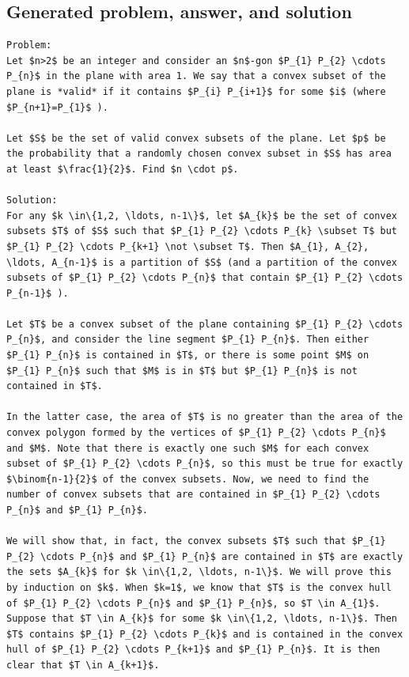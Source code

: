 \documentclass[11pt]{article}
\begin{document}
\subsection*{Generated problem, answer, and solution}
\begin{lstlisting}[style=modeloutput]
Problem:
Let $n>2$ be an integer and consider an $n$-gon $P_{1} P_{2} \cdots P_{n}$ in the plane with area 1. We say that a convex subset of the plane is *valid* if it contains $P_{i} P_{i+1}$ for some $i$ (where $P_{n+1}=P_{1}$ ).

Let $S$ be the set of valid convex subsets of the plane. Let $p$ be the probability that a randomly chosen convex subset in $S$ has area at least $\frac{1}{2}$. Find $n \cdot p$.

Solution:
For any $k \in\{1,2, \ldots, n-1\}$, let $A_{k}$ be the set of convex subsets $T$ of $S$ such that $P_{1} P_{2} \cdots P_{k} \subset T$ but $P_{1} P_{2} \cdots P_{k+1} \not \subset T$. Then $A_{1}, A_{2}, \ldots, A_{n-1}$ is a partition of $S$ (and a partition of the convex subsets of $P_{1} P_{2} \cdots P_{n}$ that contain $P_{1} P_{2} \cdots P_{n-1}$ ).

Let $T$ be a convex subset of the plane containing $P_{1} P_{2} \cdots P_{n}$, and consider the line segment $P_{1} P_{n}$. Then either $P_{1} P_{n}$ is contained in $T$, or there is some point $M$ on $P_{1} P_{n}$ such that $M$ is in $T$ but $P_{1} P_{n}$ is not contained in $T$.

In the latter case, the area of $T$ is no greater than the area of the convex polygon formed by the vertices of $P_{1} P_{2} \cdots P_{n}$ and $M$. Note that there is exactly one such $M$ for each convex subset of $P_{1} P_{2} \cdots P_{n}$, so this must be true for exactly $\binom{n-1}{2}$ of the convex subsets. Now, we need to find the number of convex subsets that are contained in $P_{1} P_{2} \cdots P_{n}$ and $P_{1} P_{n}$.

We will show that, in fact, the convex subsets $T$ such that $P_{1} P_{2} \cdots P_{n}$ and $P_{1} P_{n}$ are contained in $T$ are exactly the sets $A_{k}$ for $k \in\{1,2, \ldots, n-1\}$. We will prove this by induction on $k$. When $k=1$, we know that $T$ is the convex hull of $P_{1} P_{2} \cdots P_{n}$ and $P_{1} P_{n}$, so $T \in A_{1}$. Suppose that $T \in A_{k}$ for some $k \in\{1,2, \ldots, n-1\}$. Then $T$ contains $P_{1} P_{2} \cdots P_{k}$ and is contained in the convex hull of $P_{1} P_{2} \cdots P_{k+1}$ and $P_{1} P_{n}$. It is then clear that $T \in A_{k+1}$.


\end{lstlisting}
\end{document}
